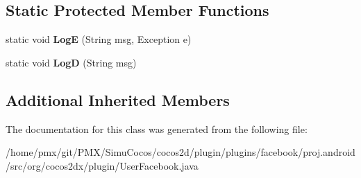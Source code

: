 \subsection*{Static Protected Member Functions}
\begin{DoxyCompactItemize}
\item 
\mbox{\label{classorg_1_1cocos2dx_1_1plugin_1_1UserFacebook_a2fac591abb65416e4f9d5db260a474f8}} 
static void {\bfseries LogE} (String msg, Exception e)
\item 
\mbox{\label{classorg_1_1cocos2dx_1_1plugin_1_1UserFacebook_aaf5779bada97224f8fc8821a87146a22}} 
static void {\bfseries LogD} (String msg)
\end{DoxyCompactItemize}
\subsection*{Additional Inherited Members}


The documentation for this class was generated from the following file\+:\begin{DoxyCompactItemize}
\item 
/home/pmx/git/\+P\+M\+X/\+Simu\+Cocos/cocos2d/plugin/plugins/facebook/proj.\+android/src/org/cocos2dx/plugin/User\+Facebook.\+java\end{DoxyCompactItemize}
